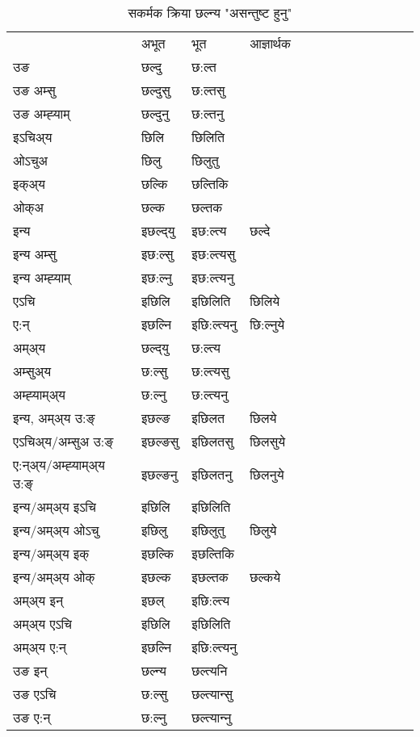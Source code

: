 \begin{table}[H]
\label{ilt.vt} \centering
\caption{सकर्मक क्रिया  छल्न्य  "असन्तुष्ट हुनु"  }
\begin{tabular}{l|l|l|l|l|l|l|l|l|l|l|l|l}  \toprule
&अभूत & भूत & आज्ञार्थक \\ 
उङ &छल्दु &छ:ल्त \\ 
उङ अम्सु&छल्दुसु &छ:ल्तसु \\ 
उङ अम्ह्‍याम्&छल्दुनु &छ:ल्तनु \\ 
इऽचिअ्य &छिलि &छिलिति   \\ 
ओऽचुअ        &छिलु &छिलुतु   \\ 
इक्अ्य&छल्कि &छल्तिकि   \\ 
ओक्अ &छल्क &छल्तक   \\ 
इन्य & इछल्द्‌यु  & इछ:ल्त्य &छल्दे  \\ 
इन्य अम्सु& इछ:ल्सु  & इछ:ल्त्यसु   \\ 
इन्य अम्ह्‍याम्& इछ:ल्नु  & इछ:ल्त्यनु   \\ 
एऽचि & इछिलि & इछिलिति &छिलिये    \\ 
ए:न् & इछल्नि  & इछि:ल्त्यनु &छि:ल्नुये  \\ 
अम्अ्य & छल्द्‌यु  & छ:ल्त्य  \\ 
अम्सुअ्य & छ:ल्सु & छ:ल्त्यसु  \\ 
अम्ह्‍याम्अ्य & छ:ल्नु  & छ:ल्त्यनु \\ 
\midrule
इन्य, अम्अ्य उ:ङ्‌ &इछल्ङ &इछिलत &छिलये \\ 
एऽचिअ्य/अम्सुअ उ:ङ्‌ &इछल्ङसु &इछिलतसु &छिलसुये \\ 
ए:न्अ्य/अम्ह्‍याम्अ्य उ:ङ्‌ &इछल्ङनु &इछिलतनु &छिलनुये \\ 
इन्य/अम्अ्य इऽचि &इछिलि &इछिलिति    \\ 
इन्य/अम्अ्य ओऽचु &इछिलु &इछिलुतु  &छिलुये  \\ 
इन्य/अम्अ्य इक् &इछल्कि &इछल्तिकि   \\ 
इन्य/अम्अ्य ओक् &इछल्क &इछल्तक  &छल्कये  \\ 
अम्अ्य इन् & इछल् & इछि:ल्त्य   \\ 
अम्अ्य एऽचि & इछिलि & इछिलिति    \\ 
अम्अ्य ए:न् & इछल्नि  & इछि:ल्त्यनु  \\ 
\midrule
उङ इन् & छल्न्य  & छल्त्यनि  \\ 
उङ एऽचि & छ:ल्सु  & छल्त्यान्सु   \\ 
उङ ए:न्& छ:ल्नु  & छल्त्यान्‍नु   \\ 
\bottomrule
\end{tabular}
\end{table}



